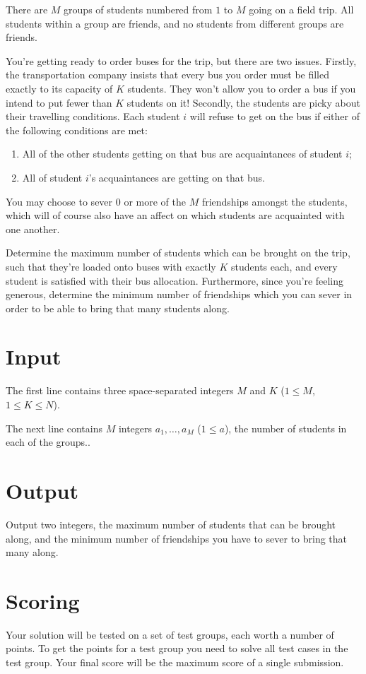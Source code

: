 There are $M$ groups of students numbered from $1$ to $M$ going on a field trip.
All students within a group are friends,  and no students from different groups are friends.

You're getting ready to order buses for the trip, but there are two issues.
Firstly, the transportation company insists that every bus you order must be filled exactly to its capacity of $K$ students.
They won't allow you to order a bus if you intend to put fewer than $K$ students on it!
Secondly, the students are picky about their travelling conditions.
Each student $i$ will refuse to get on the bus if either of the following conditions are met:
\begin{enumerate}
  \item All of the other students getting on that bus are acquaintances of student $i$;
  \item All of student $i$'s acquaintances are getting on that bus.
\end{enumerate}

You may choose to sever $0$ or more of the $M$ friendships amongst the students, which will of course also have an affect on which students are acquainted with one another.

Determine the maximum number of students which can be brought on the trip, such that they're loaded onto buses with exactly $K$ students each, and every student is satisfied with their bus allocation.
Furthermore, since you're feeling generous, determine the minimum number of friendships which you can sever in order to be able to bring that many students along.

\section*{Input}
The first line contains three space-separated integers $M$ and $K$ ($1 \le M$, $1 \le K \le N$).

The next line contains $M$ integers $a_1, \dots, a_M$ ($1 \le a$), the number of students in each of the groups..

\section*{Output}
Output two integers, the maximum number of students that can be brought along, and the minimum number of friendships you have to sever to bring that many along.

\section*{Scoring}
Your solution will be tested on a set of test groups, each worth a number of points.
To get the points for a test group you need to solve all test cases in the test group.
Your final score will be the maximum score of a single submission.

